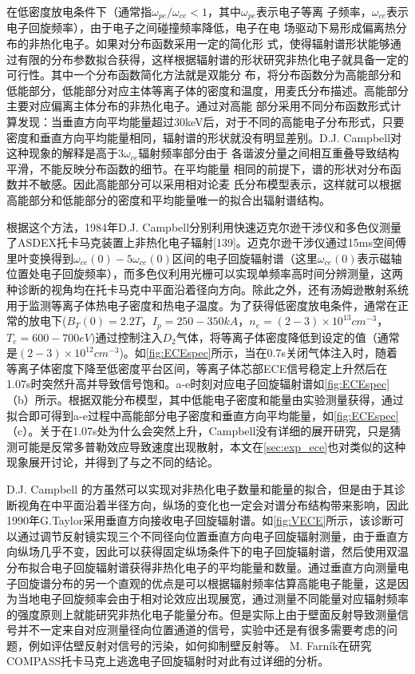 在低密度放电条件下（通常指$ω_{pe}/ω_{ce} <1$，其中$ω_{pe}$表示电子等离
子频率，$ω_{ce}$表示电子回旋频率），由于电子之间碰撞频率降低，电子在电
场驱动下易形成偏离热分布的非热化电子。如果对分布函数采用一定的简化形
式，使得辐射谱形状能够通过有限的分布参数拟合获得，这样根据辐射谱的形状研究非热化电子就具备一定的可行性。其中一个分布函数简化方法就是双能分
布，将分布函数分为高能部分和低能部分，低能部分对应主体等离子体的密度和温度，用麦氏分布描述。高能部分主要对应偏离主体分布的非热化电子。通过对高能
部分采用不同分布函数形式计算发现：当垂直方向平均能量超过30keV后，对于不同的高能电子分布形式，只要密度和垂直方向平均能量相同，辐射谱的形状就没有明显差别。D.J. Campbell\cite{RN726}对这种现象的解释是高于$3ω_{ce}$辐射频率部分由于
各谐波分量之间相互重叠导致结构平滑，不能反映分布函数的细节。在平均能量
相同的前提下，谱的形状对分布函数并不敏感。因此高能部分可以采用相对论麦
氏分布模型表示，这样就可以根据高能部分和低能部分的密度和平均能量唯一的拟合出辐射谱结构。
\par 根据这个方法，1984年D.J. Campbell分别利用快速迈克尔逊干涉仪和多色仪测量了ASDEX托卡马克装置上非热化电子辐射[139]。迈克尔逊干涉仪通过15ms空间傅里叶变换得到$ω_{ce} (0)-5ω_{ce} (0)$区间的电子回旋辐射谱（这里$ω_{ce} (0)$表示磁轴位置处电子回旋频率），而多色仪利用光栅可以实现单频率高时间分辨测量，这两种诊断的视角均在托卡马克中平面沿着径向方向。除此之外，还有汤姆逊散射系统用于监测等离子体热电子密度和热电子温度。为了获得低密度放电条件，通常在正常的放电下($B_T (0)=2.2T$，$I_p=250-350kA$，$n_e=(2-3)×10^{13} cm^{-3}$，$T_e=600-700eV)$通过控制注入$D_2$气体，将等离子体密度降低到设定的值（通常是$(2-3)×10^{12} cm^{-3}$)。如\autoref{fig:ECEspec}所示，当在0.7s关闭气体注入时，随着等离子体密度下降至低密度平台区间，等离子体芯部ECE信号稳定上升然后在1.07s时突然升高并导致信号饱和。a-e时刻对应电子回旋辐射谱如\autoref{fig:ECEspec}（b）所示。根据双能分布模型，其中低能电子密度和能量由实验测量获得，通过拟合即可得到a-e过程中高能部分电子密度和垂直方向平均能量，如\autoref{fig:ECEspec}（c）。关于在1.07s处为什么会突然上升，Campbell没有详细的展开研究，只是猜测可能是反常多普勒效应导致速度出现散射，本文在\autoref{sec:exp_ece}也对类似的这种现象展开讨论，并得到了与之不同的结论。\par
D.J. Campbell 的方虽然可以实现对非热化电子数量和能量的拟合，但是由于其诊断视角在中平面沿着半径方向，纵场的变化也一定会对谱分布结构带来影响，因此1990年G.Taylor采用垂直方向接收电子回旋辐射谱\cite{RN2037}。如\autoref{fig:VECE}所示，该诊断可以通过调节反射镜实现三个不同径向位置垂直方向电子回旋辐射测量，由于垂直方向纵场几乎不变，因此可以获得固定纵场条件下的电子回旋辐射谱，然后使用双温分布拟合电子回旋辐射谱获得非热化电子的平均能量和数量。通过垂直方向测量电子回旋谱分布的另一个直观的优点是可以根据辐射频率估算高能电子能量，这是因为当地电子回旋频率会由于相对论效应出现展宽，通过测量不同能量对应辐射频率的强度原则上就能研究非热化电子能量分布。但是实际上由于壁面反射导致测量信号并不一定来自对应测量径向位置通道的信号，实验中还是有很多需要考虑的问题，例如评估壁反射对信号的污染，如何抑制壁反射等。 M. Farník在研究COMPASS托卡马克上逃逸电子回旋辐射时对此有过详细的分析\cite{RN823}。
